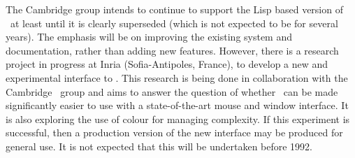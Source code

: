 The Cambridge group intends to continue to support the Lisp based
version of \HOL\ at least until it is clearly superseded (which is not
expected to be for several years). The emphasis will be on improving
the existing system and documentation, rather than adding new
features. However, there is a research project in progress at Inria
(Sofia-Antipoles, France), to develop a new and experimental interface
to \HOL. This research is being done in collaboration with the
Cambridge \HOL\ group and aims to answer the question of whether \HOL\
can be made significantly easier to use with a state-of-the-art mouse
and window interface. It is also exploring the use of colour for
managing complexity. If this experiment is successful, then a
production version of the new interface may be produced for general
use. It is not expected that this will be undertaken before 1992.




